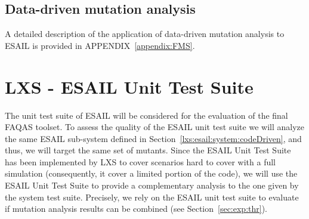 \subsection{Data-driven mutation analysis}


A detailed description of the application of data-driven mutation analysis to ESAIL is provided in APPENDIX~\ref{appendix:FMS}.

\section{LXS - ESAIL Unit Test Suite}
\label{chapter:caseStudies:LXS:Unit}



The unit test suite of ESAIL will be considered for the evaluation of the final FAQAS toolset. 
To assess the quality of the ESAIL unit test suite we will analyze the same ESAIL sub-system defined in Section~\ref{lxs:esail:system:codeDriven}, and thus, we will target the same set of mutants. Since the ESAIL Unit Test Suite has been implemented by LXS to cover scenarios hard to cover with a full simulation (consequently, it cover a limited portion of the code), we will use the ESAIL Unit Test Suite to provide a complementary analysis to the one given by the system test suite.
Precisely, we rely on the ESAIL unit test suite to evaluate if mutation analysis results can be combined (see Section~\ref{sec:exp:thr}). 


